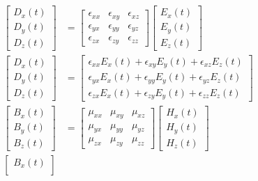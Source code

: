 \begin{itemize}
\begin{align*}
\begin{bmatrix}
        D_x(t) \\
        D_y(t) \\
        D_z(t)
      \end{bmatrix}
      &=
      \begin{bmatrix}
        \epsilon_{xx} & \epsilon_{xy} & \epsilon_{xz} \\
        \epsilon_{yx} & \epsilon_{yy} & \epsilon_{yz} \\
        \epsilon_{zx} & \epsilon_{zy} & \epsilon_{zz}
      \end{bmatrix}
      \begin{bmatrix}
        E_x(t) \\
        E_y(t) \\
        E_z(t)
      \end{bmatrix} \\
      \begin{bmatrix}
        D_x(t) \\
        D_y(t) \\
        D_z(t)
      \end{bmatrix}
      &=
      \begin{bmatrix}
        \epsilon_{xx} E_x(t) + \epsilon_{xy} E_y(t) + \epsilon_{xz} E_z(t) \\
        \epsilon_{yx} E_x(t) + \epsilon_{yy} E_y(t) + \epsilon_{yz} E_z(t) \\
        \epsilon_{zx} E_x(t) + \epsilon_{zy} E_y(t) + \epsilon_{zz} E_z(t)
      \end{bmatrix} \\
      \begin{bmatrix}
        B_x(t) \\
        B_y(t) \\
        B_z(t)
      \end{bmatrix}
      &=
      \begin{bmatrix}
        \mu_{xx} & \mu_{xy} & \mu_{xz} \\
        \mu_{yx} & \mu_{yy} & \mu_{yz} \\
        \mu_{zx} & \mu_{zy} & \mu_{zz}
      \end{bmatrix}
      \begin{bmatrix}
        H_x(t) \\
        H_y(t) \\
        H_z(t)
      \end{bmatrix} \\
        \begin{bmatrix}
        B_x(t) \\

\end{bmatrix}
\end{align*}
\end{itemize}
